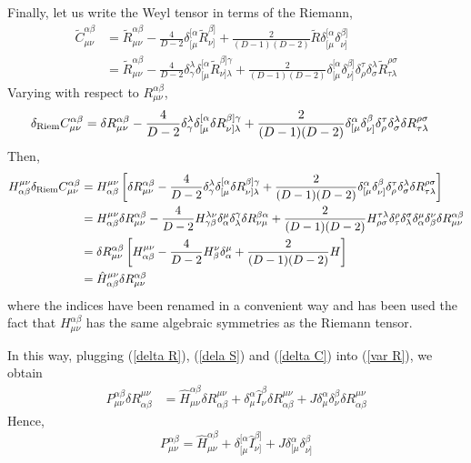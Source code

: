 Finally, let us write the Weyl tensor in terms of the Riemann,
\begin{align*}
    \tilde{C}^{\alpha\beta}_{\mu\nu}&=\tilde{R}^{\alpha\beta}_{\mu\nu}-\frac{4}{D-2}\delta^{[\alpha}_{[\mu}\tilde{R}^{\beta]}_{\nu]}+\frac{2}{(D-1)(D-2)}\tilde{R}\delta^{[\alpha}_{[\mu}\delta^{\beta]}_{\nu]}\\
    &=\tilde{R}^{\alpha\beta}_{\mu\nu}-\frac{4}{D-2}\delta^\lambda_\gamma \delta^{[\alpha}_{[\mu}\tilde{R}^{\beta]\gamma}_{\nu]\lambda}+\frac{2}{(D-1)(D-2)}\delta^{[\alpha}_{[\mu}\delta^{\beta]}_{\nu]}\delta^\tau_\rho\delta^\lambda_\sigma\tilde{R}^{\rho\sigma}_{\tau\lambda}
\end{align*}
Varying with respect to $R^{\alpha\beta}_{\mu\nu}$,
\begin{align*}
    \delta_{\rm Riem}C^{\alpha\beta}_{\mu\nu}&=\delta R^{\alpha\beta}_{\mu\nu}-\frac{4}{D-2}\delta^\lambda_\gamma\delta^{[\alpha}_{[\mu}\delta R^{\beta]\gamma}_{\nu]\lambda}+\frac{2}{(D-1)(D-2)}\delta^\alpha_{[\mu}\delta^\beta_{\nu]}\delta^\tau_\rho\delta^\lambda_\sigma \delta R^{\rho\sigma}_{\tau\lambda}
\end{align*}
Then,
\begin{align}
   \nonumber H^{\mu\nu}_{\alpha\beta}\delta_{\rm Riem}C^{\alpha\beta}_{\mu\nu}&=H^{\mu\nu}_{\alpha\beta}\left[\delta R^{\alpha\beta}_{\mu\nu}-\frac{4}{D-2}\delta^\lambda_\gamma\delta^{[\alpha}_{[\mu}\delta R^{\beta]\gamma}_{\nu]\lambda}+\frac{2}{(D-1)(D-2)}\delta^\alpha_{[\mu}\delta^\beta_{\nu]}\delta^\tau_\rho\delta^\lambda_\sigma \delta R^{\rho\sigma}_{\tau\lambda}\right]\\
    \nonumber&=H^{\mu\nu}_{\alpha\beta}\delta R^{\alpha\beta}_{\mu\nu}-\frac{4}{D-2}H^{\lambda\nu}_{\gamma\beta}\delta^\mu_\alpha\delta^\gamma_\lambda\delta R^{\beta\alpha}_{\nu\mu}+\frac{2}{(D-1)(D-2)}H^{\tau\lambda}_{\rho\sigma}\delta^\rho_\tau\delta^\sigma_\lambda \delta^\mu_\alpha\delta^\nu_\beta\delta R^{\alpha\beta}_{\mu\nu}\\
    \nonumber&=\delta R^{\alpha\beta}_{\mu\nu}\left[H^{\mu\nu}_{\alpha\beta}-\frac{4}{D-2}H^\nu_\beta \delta^\mu_\alpha +\frac{2}{(D-1)(D-2)}H\right]\\
    &=\hat{H}^{\mu\nu}_{\alpha\beta}\delta R^{\alpha\beta}_{\mu\nu}\label{delta C}
\end{align}
where the indices have been renamed in a convenient way and has been used the fact that $H^{\alpha\beta}_{\mu\nu}$ has the same algebraic symmetries as the Riemann tensor. 

In this way, plugging (\ref{delta R}), (\ref{dela S}) and (\ref{delta C}) into (\ref{var R}), we obtain
\begin{align*}
    P^{\alpha\beta}_{\mu\nu}\delta R^{\mu\nu}_{\alpha\beta}&=\hat{H}^{\alpha\beta}_{\mu\nu}\delta R^{\mu\nu}_{\alpha\beta}+\delta^\alpha_\mu\hat{I}^\beta_\nu\delta R^{\mu\nu}_{\alpha\beta}+J\delta^\alpha_\mu\delta^\beta_\nu\delta R^{\mu\nu}_{\alpha\beta}
\end{align*}
Hence,
\begin{equation}\label{P-tensor}
    P^{\alpha\beta}_{\mu\nu}=\hat{H}^{\alpha\beta}_{\mu\nu}+\delta^{[\alpha}_{[\mu}\hat{I}^{\beta]}_{\nu]}+J\delta^\alpha_{[\mu}\delta^\beta_{\nu]}
\end{equation}




